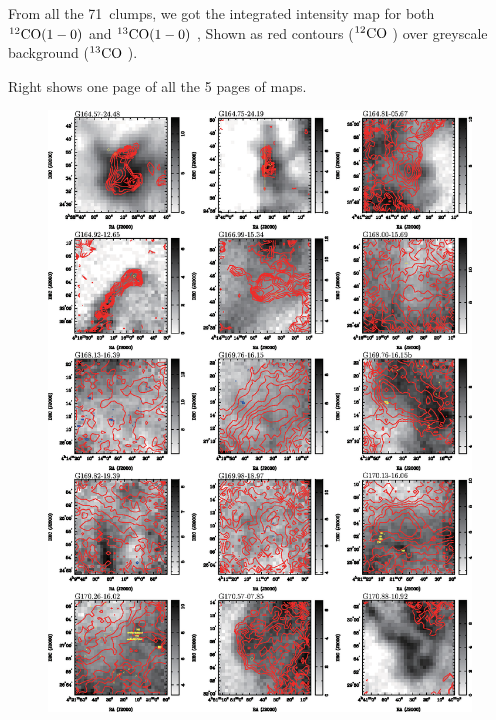 \documentclass{article}
\newcommand{\coa}{$\rm ^{12}CO$ }
\newcommand{\cob}{$\rm ^{13}CO$ }
\newcommand{\coaa}{$\rm^{12}CO(1-0)$ }
\newcommand{\cobb}{$\rm^{13}CO(1-0)$ }
\newcommand{\sigmath}{$\sigma _{Therm}$\ }
\newcommand{\sigmant}{$\sigma _{NT}$\ }
\newcommand{\numsou}{71\ }
\begin{document}
\begin{multicols}{2}
From all the \numsou clumps, we got the integrated intensity map for both \coaa and \cobb, Shown as red contours (\coa) over greyscale background (\cob).

Right shows one page of all the 5 pages of maps.
\begin{figure}[H]
          \centering
          \includegraphics[totalheight=90 mm]{contours.eps}
       \end{figure}
\end{multicols}
\newpage
\end{document}
